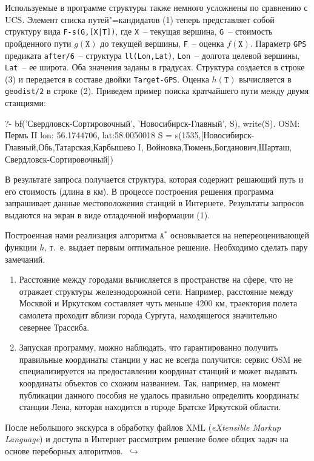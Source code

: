 \documentclass[a4paper,14pt, openany, twoside, final]{extbook} %
\newcommand{\eeng}[1]{\emph{\foreignlanguage{english}{#1}}}
\newcommand{\aaa}[2][acolor]{\noindent\textcolor{eclr}%
{+\ [}\textcolor{#1}{#2}\textcolor{eclr}{]}}
\newcommand{\goforth}[1]{$\,\hookrightarrow$\pageref{#1}}
\begin{document}
Используемые в программе структуры также немного усложнены по сравнению с UCS.  Элемент списка путей"=кандидатов (1) теперь представляет собой структуру вида \texttt{F-s(G,[X|T])}, где \texttt{X}~-- текущая вершина, \texttt{G}~-- стоимость пройденного пути $g(\mathtt{X})$ до текущей вершины, \texttt{F}~-- оценка $f(\mathtt{X})$.  Параметр \texttt{GPS} предиката \texttt{after/6}~-- структура \texttt{ll(Lon,Lat)}, \texttt{Lon}~-- долгота целевой вершины, \texttt{Lat}~-- ее широта.   Оба значения заданы в градусах.  Структура создается в строке (3) и передается в составе двойки \texttt{Target-GPS}.  Оценка $h(\mathtt{T})$ вычисляется в \texttt{geodist/2} в строке (2).  Приведем пример поиска кратчайшего пути между двумя станциями:

\begin{proexp}
?- bf('Свердловск-Сортировочный', 'Новосибирск-Главный', S),
    write(S).
OSM: Пермь II
    lon: 56.1744706, lat:58.0050018    %
S = s(1535,[Новосибирск-Главный,Обь,Татарская,Карбышево I,
    Войновка,Тюмень,Богданович,Шарташ,
    Свердловск-Сортировочный])
\end{proexp}

В результате запроса получается структура, которая содержит решающий путь и его стоимость (длина в км).  В процессе построения решения программа запрашивает данные местоположения станций в Интернете.  Результаты запросов выдаются на экран в виде отладочной информации (1).


Построенная нами реализация алгоритма $\mathtt{A}^*$ основывается на непереоценивающей функции $h$, т.~е. выдает первым оптимальное решение.  Необходимо сделать пару замечаний.
\begin{enumerate}
\item Расстояние между городами вычисляется в пространстве на сфере, что не отражает структуры железнодорожной сети.  Например, расстояние между Москвой и Иркутском составляет чуть меньше 4200 км,  траектория полета самолета проходит вблизи города Сургута, находящегося значительно севернее Трассиба.
\item Запуская программу, можно наблюдать, что гарантированно получить правильные координаты станции у нас не всегда получится: сервис OSM не специализируется на предоставлении координат станций и может выдавать координаты объектов со схожим названием.  Так, например, на момент публикации данного пособия не удалось правильно определить координаты станции Лена, которая находится в городе Братске Иркутской области.
\end{enumerate}
После небольшого экскурса в обработку файлов XML (\eeng{eXtensible Markup Language}) и доступа в Интернет рассмотрим решение более общих задач на основе переборных алгоритмов.  \goforth{sec:britmuseum}
\end{document}
